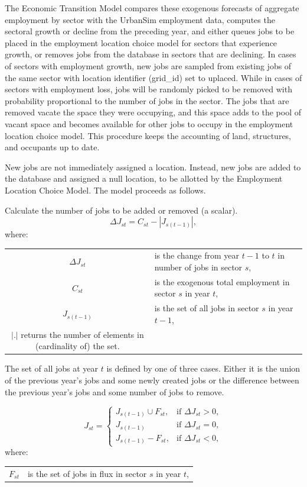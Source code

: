 The Economic Transition Model compares these exogenous
forecasts of aggregate employment by sector with the
UrbanSim employment data, computes the sectoral growth or
decline from the preceding year, and either queues jobs to
be placed in the employment location choice model for
sectors that experience growth, or removes jobs from the
database in sectors that are declining.  In cases of sectors
with employment growth, new jobs are sampled from existing
jobs of the same sector with location identifier (grid_id)
set to uplaced.  While in cases of sectors with employment
loss, jobs will be randomly picked to be removed with
probability proportional to the number of jobs in the
sector.  The jobs that are removed vacate the space they
were occupying, and this space adds to the pool of vacant
space and becomes available for other jobs to occupy in the
employment location choice model.  This procedure keeps the
accounting of land, structures, and occupants up to date.

New jobs are not immediately assigned a location.  Instead,
new jobs are added to the database and assigned a null
location, to be allotted by the Employment Location Choice
Model. The model proceeds as follows.

Calculate the number of jobs to be added or removed (a
scalar).
\begin{equation}
\Delta J_{st} = C_{st} - |J_{s(t-1)}|,
\end{equation}
where:
\begin{center}
\begin{tabular}{c p{5.5in}}
$\Delta J_{st}$ & is the change from year $t-1$ to $t$ in number of jobs in sector $s$,\\
$C_{st}$ & is the exogenous total employment in sector $s$ in year $t$,\\
$J_{s(t-1)}$ & is the set of all jobs in sector $s$ in year $t-1$,\\
$|.|$ returns the number of elements in (cardinality of) the set.\\
\end{tabular}
\end{center}

The set of all jobs at year $t$ is defined by one of three cases.
Either it is the union of the previous year's jobs and some newly
created jobs or the difference between the previous year's jobs
and some number of jobs to remove.

\begin{equation}
J_{st} =
    \begin{cases}
        J_{s(t-1)} \cup F_{st}, &\text{if $\Delta J_{st} > 0$}, \\
        J_{s(t-1)} &\text{if $\Delta J_{st} = 0$},\\
        J_{s(t-1)} - F_{st}, &\text{if $\Delta J_{st} < 0$},
    \end{cases}
\end{equation}
where:
\begin{center}
\begin{tabular}{c p{5.5in}}
$F_{st}$ & is the set of jobs in flux in sector $s$ in year $t$, \\
\end{tabular}
\end{center}

